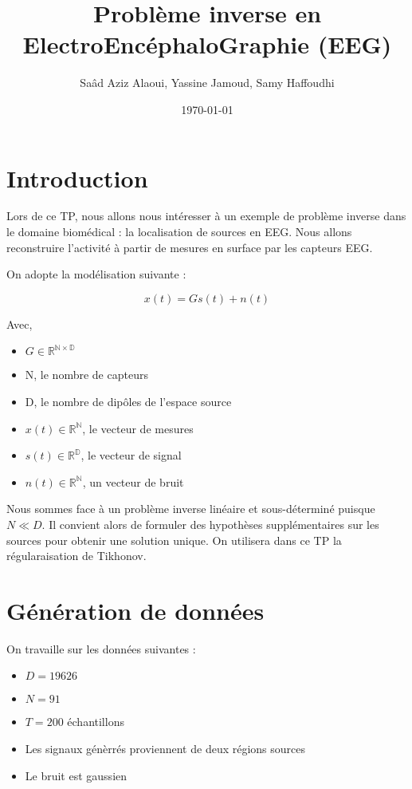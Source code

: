 \documentclass[12pt,a4paper,titlepage]{article}
\title{Problème inverse en ElectroEncéphaloGraphie (EEG)}
\author{Saâd Aziz Alaoui, Yassine Jamoud, Samy Haffoudhi}
\date{\today}
\begin{document}
\maketitle

\section*{Introduction}


Lors de ce TP, nous allons nous intéresser à un exemple de problème
inverse dans le domaine biomédical : la localisation de sources en EEG.
Nous allons reconstruire l'activité à partir de mesures en surface par
les capteurs EEG.

On adopte la modélisation suivante :

$$ x(t) = G s(t) + n(t) $$

Avec,

\begin{itemize}
    \item{$ G \in \mathbb{R^{N \times D}} $}
    \item{N, le nombre de capteurs}
    \item{D, le nombre de dipôles de l'espace source}
    \item{$ x(t) \in \mathbb{R^N} $, le vecteur de mesures}
    \item{$ s(t) \in \mathbb{R^D} $, le vecteur de signal}
    \item{$ n(t) \in \mathbb{R^N} $, un vecteur de bruit}
\end{itemize}

Nous sommes face à un problème inverse linéaire et sous-déterminé
puisque $N \ll D$. Il convient alors de formuler des hypothèses
supplémentaires sur les sources pour obtenir une solution unique.
On utilisera dans ce TP la régularaisation de Tikhonov.

\section{Génération de données}

On travaille sur les données suivantes :

\begin{itemize}
    \item{$ D = 19626 $}
    \item{$ N = 91 $}
    \item{$ T = 200 $ échantillons}
    \item{Les signaux génèrrés proviennent de deux régions sources}
    \item{Le bruit est gaussien}
\end{itemize}
\end{document}
